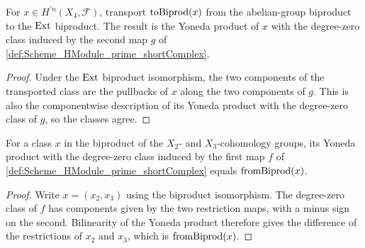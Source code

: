 \begin{lemma}\leanok
  \label{lem:Scheme_HModule_prime_biprodAddEquiv_symm_biprodIsoProd_hom_toBiprod_apply}

  For \(x\in H^{\prime n}(X_4,\mathcal F)\), transport \(\operatorname{toBiprod}(x)\) from the abelian-group biproduct to the \(\operatorname{Ext}\) biproduct. The result is the Yoneda product of \(x\) with the degree-zero class induced by the second map \(g\) of \cref{def:Scheme_HModule_prime_shortComplex}.
\end{lemma}

\begin{proof}
  
  \leanok
  Under the \(\operatorname{Ext}\) biproduct isomorphism, the two components of the transported class are the pullbacks of \(x\) along the two components of \(g\). This is also the componentwise description of its Yoneda product with the degree-zero class of \(g\), so the classes agree.
\end{proof}

\begin{lemma}\leanok
  \label{lem:Scheme_HModule_prime_mk_zero_f_comp_biprodAddEquiv_symm_biprodIsoProd_hom}

  For a class \(x\) in the biproduct of the \(X_2\)- and \(X_3\)-cohomology groups, its Yoneda product with the degree-zero class induced by the first map \(f\) of \cref{def:Scheme_HModule_prime_shortComplex} equals \(\operatorname{fromBiprod}(x)\).
\end{lemma}

\begin{proof}
  
  \leanok
  Write \(x=(x_2,x_3)\) using the biproduct isomorphism. The degree-zero class of \(f\) has components given by the two restriction maps, with a minus sign on the second. Bilinearity of the Yoneda product therefore gives the difference of the restrictions of \(x_2\) and \(x_3\), which is \(\operatorname{fromBiprod}(x)\).
\end{proof}

